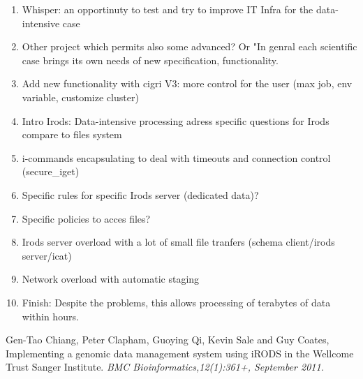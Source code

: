 \documentclass[a4paper, 10pt]{article}
\begin{document}
\begin{multicols}{2}
	\begin{enumerate}
  	  \item Whisper: an opportinuty to test and try to improve IT Infra for the data-intensive case
  	  \item Other project which permits also some advanced? Or "In genral each scientific case brings its own needs of new specification, functionality.
	  \item Add new functionality with cigri V3: more control for the user (max job, env variable, customize cluster)
	  \item Intro Irods: Data-intensive processing adress specific questions for Irods compare to files system
	  \item i-commands encapsulating to deal with timeouts and connection control (secure\_iget)
	  \item Specific rules for specific Irods server (dedicated data)?
	  \item Specific policies to acces files?
      \item Irods server overload with a lot of small file tranfers (schema client/irods server/icat)
      \item Network overload with automatic staging
      \item Finish: Despite the problems, this allows processing of terabytes of data within hours.
	\end{enumerate}



\begin{thebibliography}{9}
 Gen-Tao Chiang, Peter Clapham, Guoying Qi, Kevin Sale and Guy Coates,
 Implementing a genomic data management system using iRODS in the Wellcome Trust Sanger Institute.
{\em BMC Bioinformatics,12(1):361+, September 2011.}
\end{thebibliography}

\end{multicols}
\end{document}
